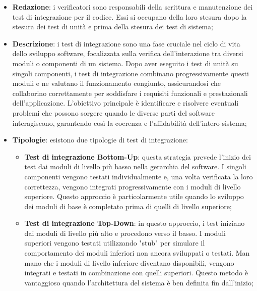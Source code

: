 \begin{itemize}
    \item \textbf{Redazione}: i verificatori sono responsabili della scrittura e manutenzione dei test di integrazione per il codice. Essi si occupano della loro stesura dopo la stesura dei test di unità e prima della stesura dei test di sistema;
    \item \textbf{Descrizione}: i test di integrazione sono una fase cruciale nel ciclo di vita dello sviluppo software, focalizzata sulla verifica dell'interazione tra diversi moduli o componenti di un sistema. Dopo aver eseguito i test di unità su singoli componenti, i test di integrazione combinano progressivamente questi moduli e ne valutano il funzionamento congiunto, assicurandosi che collaborino correttamente per soddisfare i requisiti funzionali e prestazionali dell'applicazione. L'obiettivo principale è identificare e risolvere eventuali problemi che possono sorgere quando le diverse parti del software interagiscono, garantendo così la coerenza e l'affidabilità dell'intero sistema;
    \item \textbf{Tipologie}: esistono due tipologie di test di integrazione:
    \begin{itemize}
        \item \textbf{Test di integrazione Bottom-Up}: questa strategia prevede l'inizio dei test dai moduli di livello più basso nella gerarchia del software. I singoli componenti vengono testati individualmente e, una volta verificata la loro correttezza, vengono integrati progressivamente con i moduli di livello superiore. Questo approccio è particolarmente utile quando lo sviluppo dei moduli di base è completato prima di quelli di livello superiore;
        \item \textbf{Test di integrazione Top-Down}: in questo approccio, i test iniziano dai moduli di livello più alto e procedono verso il basso. I moduli superiori vengono testati utilizzando "stub" per simulare il comportamento dei moduli inferiori non ancora sviluppati o testati. Man mano che i moduli di livello inferiore diventano disponibili, vengono integrati e testati in combinazione con quelli superiori. Questo metodo è vantaggioso quando l'architettura del sistema è ben definita fin dall'inizio;
    \end{itemize}
\end{itemize}

